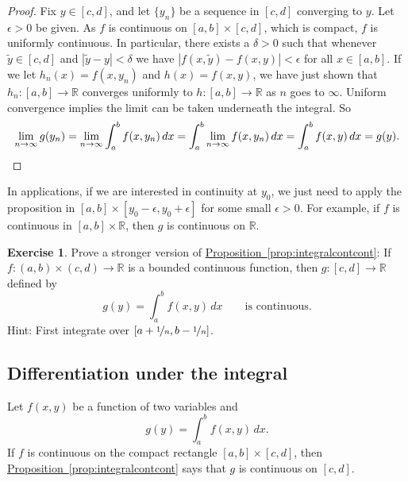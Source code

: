 \documentclass[12pt,openany]{book}
\newcommand{\abs}[1]{\left\lvert {#1} \right\rvert}
\newcommand{\R}{{\mathbb{R}}}
\theoremstyle{plain}
\theoremstyle{remark}
\theoremstyle{definition}
\newenvironment{exbox}{%
    \def\FrameCommand{\vrule width 1pt \relax\hspace {10pt}}%
    \MakeFramed {\advance \hsize -\width \FrameRestore }%
}{%
    \endMakeFramed
}
\theoremstyle{exercise}
\newtheorem{exercise}{Exercise}[section]
\theoremstyle{example}
\newcommand{\propref}[1]{\hyperref[#1]{Proposition~\ref*{#1}}}
\begin{document}
\begin{proof}
Fix $y \in [c,d]$, and let $\{ y_n \}$ be a sequence in $[c,d]$
converging to $y$.
Let $\epsilon > 0$ be given.
As $f$ is continuous on $[a,b] \times [c,d]$, which is compact, $f$
is uniformly continuous.  
In particular, there exists a $\delta > 0$ such that
whenever $\widetilde{y} \in [c,d]$ and
$\abs{\widetilde{y}-y} < \delta$ we have
$\abs{f(x,\widetilde{y})-f(x,y)} < \epsilon$ for all $x \in [a,b]$.
If we let $h_n(x)= f(x,y_n)$ and $h(x) = f(x,y)$,
we have just shown that
$h_n \colon [a,b] \to \R$ converges uniformly 
to
$h \colon [a,b] \to \R$ as $n$ goes to $\infty$.
Uniform convergence implies the limit can be taken underneath the integral.
So
\begin{equation*}
\lim_{n\to \infty}
g(y_n)
=
\lim_{n\to \infty}
\int_a^b 
f(x,y_n) \,dx 
= 
\int_a^b 
\lim_{n\to \infty}
f(x,y_n) \,dx 
= 
\int_a^b 
f(x,y) \,dx = g(y) . \qedhere
\end{equation*}
\end{proof}

In applications, if we are interested in continuity at $y_0$, we just
need to apply the proposition in $[a,b] \times [y_0-\epsilon,y_0+\epsilon]$
for some small $\epsilon > 0$.  For example, if $f$ is continuous in
$[a,b] \times \R$, then $g$ is continuous on $\R$.

\begin{exbox}
\begin{exercise} \label{exercise:integralcontcontextra}
Prove a stronger version of \propref{prop:integralcontcont}:
If $f \colon (a,b) \times (c,d) \to \R$ is a bounded continuous function,
then $g \colon [c,d] \to \R$ defined by
\begin{equation*}
g(y) = \int_a^b f(x,y) \,dx  \qquad \text{is continuous}.
\end{equation*}
Hint: First integrate over $[a+\nicefrac{1}{n},b-\nicefrac{1}{n}]$.
\end{exercise}
\end{exbox}

\subsection{Differentiation under the integral}
\label{subsec:diffunderint}

Let $f(x,y)$ be a function of two variables and
\begin{equation*}
g(y) = \int_a^b f(x,y) \,dx .
\end{equation*}
If $f$ is continuous on the compact rectangle $[a,b] \times [c,d]$, then
\propref{prop:integralcontcont}
says that $g$ is continuous on $[c,d]$.
\end{document}
